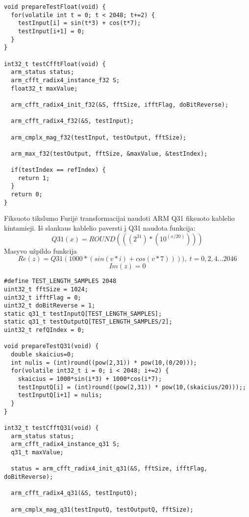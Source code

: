 \documentclass[a4paper, 12pt]{article} %
\begin{document}
\begin{onehalfspacing}
\begin{verbatim}
void prepareTestFloat(void) {
  for(volatile int t = 0; t < 2048; t+=2) {
    testInput[i] = sin(t*3) + cos(t*7);
    testInput[i+1] = 0;
  }
}

int32_t testCfftFloat(void) { 
  arm_status status; 
  arm_cfft_radix4_instance_f32 S; 
  float32_t maxValue;  
   
  arm_cfft_radix4_init_f32(&S, fftSize, ifftFlag, doBitReverse); 
   
  arm_cfft_radix4_f32(&S, testInput); 
   
  arm_cmplx_mag_f32(testInput, testOutput, fftSize);  
   
  arm_max_f32(testOutput, fftSize, &maxValue, &testIndex); 
   
  if(testIndex == refIndex) { 
    return 1;
  }
  return 0;
} 
\end{verbatim}  
Fiksuoto tikslumo Furij\.e transformacijai naudoti ARM Q31 fiksuoto kablelio kintamieji. I\v{s} slankaus kablelio paversti \k{i} Q31 naudota funkcija:
\begin{equation}
Q31(x)= ROUND(((2^31)*(10^(x/20))))
\end{equation}   
Masyvo u\v{z}pildo funkcija
\begin{equation*}
Re(z) = Q31(1000*(sin(v*i) + cos(v*7)))),\; t = 0, 2, 4... 2046
\end{equation*}
\begin{equation}
Im(z) = 0
\end{equation}
\begin{verbatim}
#define TEST_LENGTH_SAMPLES 2048
uint32_t fftSize = 1024; 
uint32_t ifftFlag = 0; 
uint32_t doBitReverse = 1; 
static q31_t testInputQ[TEST_LENGTH_SAMPLES]; 
static q31_t testOutputQ[TEST_LENGTH_SAMPLES/2]; 
uint32_t refQIndex = 0;

void prepareTestQ31(void) {
  double skaicius=0;
  int nulis = (int)round((pow(2,31)) * pow(10,(0/20)));
  for(volatile int32_t i = 0; i < 2048; i+=2) {
    skaicius = 1000*sin(i*3) + 1000*cos(i*7);
    testInputQ[i] = (int)round((pow(2,31)) * pow(10,(skaicius/20)));;
    testInputQ[i+1] = nulis;
  }
}

int32_t testCfftQ31(void) { 
  arm_status status; 
  arm_cfft_radix4_instance_q31 S; 
  q31_t maxValue; 
   
  status = arm_cfft_radix4_init_q31(&S, fftSize, ifftFlag, doBitReverse); 
   
  arm_cfft_radix4_q31(&S, testInputQ); 
  
  arm_cmplx_mag_q31(testInputQ, testOutputQ, fftSize);  
 

\end{verbatim}
\end{onehalfspacing}
\end{document}
